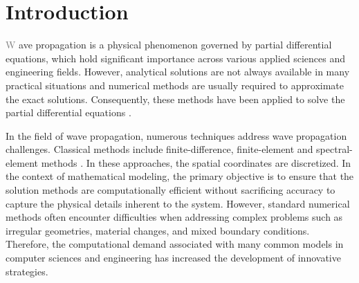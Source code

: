 \documentclass[11pt,twoside]{article}
\begin{document}
\section*{Introduction}

\lettrine{\textcolor{gray}{W}}{ }ave propagation is a physical phenomenon governed by partial differential equations, 
which hold significant importance across various applied sciences and engineering fields. However, analytical 
solutions are not always available in many practical situations and numerical methods are usually required to 
approximate the exact solutions. Consequently, these methods have been applied to solve the partial differential 
equations \citep{Seriani2020}.

In the field of wave propagation, numerous techniques address wave propagation challenges. Classical methods include 
finite-difference, finite-element and spectral-element methods \citep{Moczo, virieux_review_2011, Igel2017,
komatitsch_introduction_1999,chaljub_spectral-element_2007}. In these approaches, the spatial coordinates are discretized. 
In the context of mathematical modeling, the primary objective is to ensure that the solution methods 
are computationally efficient without sacrificing accuracy to capture the physical details inherent to the 
system. However, standard numerical methods often encounter difficulties when addressing complex problems 
such as irregular geometries, material changes, and mixed boundary conditions. Therefore, the computational 
demand associated with many common models in computer sciences and engineering has increased the development 
of innovative strategies.
\end{document}

